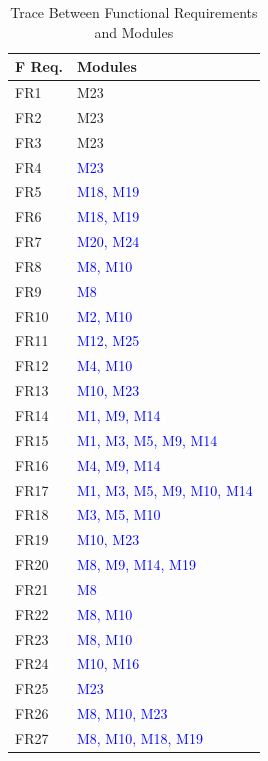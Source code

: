\documentclass[12pt, titlepage]{article}
\begin{document}
\begin{table}[H]
\centering
\begin{tabular}{p{} p{}}
\toprule
\textbf{F Req.} & \textbf{Modules}\\
\midrule
FR1 & M23\\
FR2 & M23\\
FR3 & M23\\
FR4 & \textcolor{blue}{M23}\\
FR5 & \textcolor{blue}{M18, M19}\\
FR6 & \textcolor{blue}{M18, M19}\\
FR7 & \textcolor{blue}{M20, M24}\\
FR8 & \textcolor{blue}{M8, M10}\\
FR9 & \textcolor{blue}{M8}\\
FR10 & \textcolor{blue}{M2, M10}\\
FR11 & \textcolor{blue}{M12, M25}\\
FR12 & \textcolor{blue}{M4, M10}\\
FR13 & \textcolor{blue}{M10, M23}\\
FR14 & \textcolor{blue}{M1, M9, M14}\\
FR15 & \textcolor{blue}{M1, M3, M5, M9, M14}\\
FR16 & \textcolor{blue}{M4, M9, M14}\\
FR17 & \textcolor{blue}{M1, M3, M5, M9, M10, M14}\\
FR18 & \textcolor{blue}{M3, M5, M10}\\
FR19 & \textcolor{blue}{M10, M23}\\
FR20 & \textcolor{blue}{M8, M9, M14, M19}\\
FR21 & \textcolor{blue}{M8}\\
FR22 & \textcolor{blue}{M8, M10}\\
FR23 & \textcolor{blue}{M8, M10}\\
FR24 & \textcolor{blue}{M10, M16}\\
FR25 & \textcolor{blue}{M23}\\
FR26 & \textcolor{blue}{M8, M10, M23}\\
FR27 & \textcolor{blue}{M8, M10, M18, M19}\\
\bottomrule
\end{tabular}
\caption{Trace Between Functional Requirements and Modules}
\label{TblRT}
\end{table}
\end{document}
